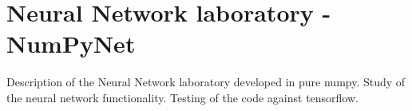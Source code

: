 \documentclass{standalone}
\begin{document}
\section[NumPyNet]{Neural Network laboratory - NumPyNet}\label{numpynet}

Description of the Neural Network laboratory developed in pure numpy.
Study of the neural network functionality.
Testing of the code against tensorflow.
\end{document}
